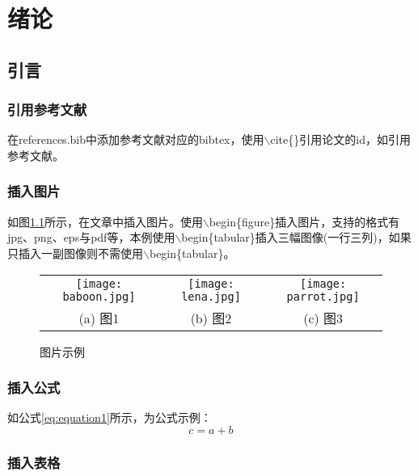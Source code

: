 
\chapter{绪论}

\section{引言}

\subsection{引用参考文献}
在references.bib中添加参考文献对应的bibtex，使用$\backslash$cite\{\}引用论文的id，如引用参考文献\cite{barnes2009patchmatch}。

\subsection{插入图片}
如图\ref{fig:figure1}所示，在文章中插入图片。使用$\backslash$begin\{figure\}插入图片，支持的格式有jpg、png、eps与pdf等，本例使用$\backslash$begin\{tabular\}插入三幅图像(一行三列)，如果只插入一副图像则不需使用$\backslash$begin\{tabular\}。

\begin{figure}[htb]
	\centering
	\setlength\tabcolsep{3pt}  %
	\vspace{5pt} %
	\begin{tabular}{ccc}
		\texttt{[image: baboon.jpg]} &
		\texttt{[image: lena.jpg]} &
		\texttt{[image: parrot.jpg]} \\
		(a) 图1 & (b) 图2 & (c) 图3 \\[1ex]
	\end{tabular}
	\caption{图片示例}
	\label{fig:figure1}
\end{figure}

\subsection{插入公式}
如公式\eqref{eq:equation1}所示，为公式示例：
\begin{equation}
	c = a + b
	\label{eq:equation1}
\end{equation}

\subsection{插入表格}

